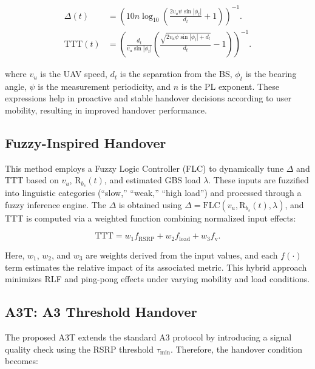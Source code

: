 \documentclass[10pt,conference]{IEEEtran}
\begin{document}
\begin{align}
\Delta(t) &= \left(10n \log_{10}\left(\frac{2v_u \psi \sin |\phi_t|}{d_t} + 1\right)\right)^{-1}. \\
\mathrm{TTT}(t) &= \left(\frac{d_t}{v_u \sin |\phi_t|} \left(\frac{\sqrt{2v_u \psi \sin |\phi_t| + d_t}}{d_t} - 1\right)\right)^{-1}.
\end{align}

where $v_u$ is the UAV speed, $d_t$ is the separation from the BS, $\phi_t$ is the bearing angle, $\psi$ is the measurement periodicity, and $n$ is the PL exponent. These expressions help in proactive and stable handover decisions according to user mobility, resulting in improved handover performance. 


\subsection{Fuzzy-Inspired Handover}
This method employs a Fuzzy Logic Controller (FLC) to dynamically tune $\Delta$ and TTT based on $v_u$, $\mathrm{R}_{b_s}(t)$, and estimated GBS load $\lambda$. These inputs are fuzzified into linguistic categories (``slow,'' ``weak,'' ``high load'') and processed through a fuzzy inference engine. The $\Delta$ is obtained using $\Delta = \mathrm{FLC}(v_u, \mathrm{R}_{b_s}(t), \lambda)$, and TTT is computed via a weighted function combining normalized input effects: 




\begin{equation}
\mathrm{TTT} = w_1 f_{\mathrm{RSRP}} + w_2 f_{\mathrm{load}} + w_3 f_{\mathrm{v}}.
\end{equation}

Here, $w_1$, $w_2$, and $w_3$ are weights derived from the input values, and each $f(\cdot)$ term estimates the relative impact of its associated metric. This hybrid approach minimizes RLF and ping-pong effects under varying mobility and load conditions.



\subsection{A3T: A3 Threshold Handover}

The proposed A3T extends the standard A3 protocol by introducing a signal quality check using the RSRP threshold $\tau_{\min}$. Therefore, the handover condition becomes:
\end{document}
